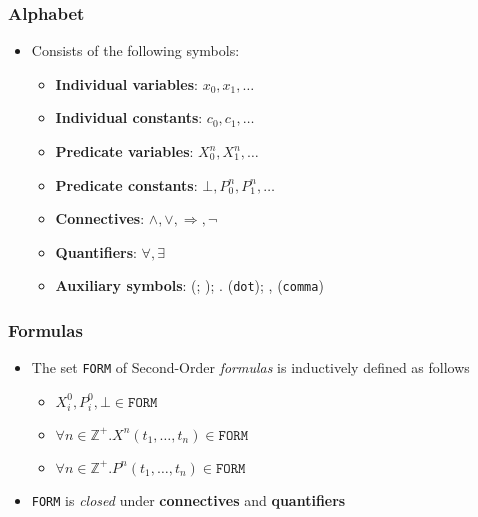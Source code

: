 \documentclass{beamer}
\begin{document}
                \begin{frame}
                    \frametitle{Alphabet}
                    \begin{itemize}
                        \item Consists of the following symbols:
                              \begin{itemize}
                                \item \textbf{Individual variables}: $ x_0, x_1, \dots $
                                \item \textbf{Individual constants}: $ c_0, c_1, \dots $
                                \item \textbf{Predicate variables}: $ X_0^n, X_1^n, \dots $
                                \item \textbf{Predicate constants}: $ \bot, P_0^n, P_1^n, \dots $
                                \item \textbf{Connectives}: $ \wedge, \vee, \Rightarrow, \neg $
                                \item \textbf{Quantifiers}: $ \forall, \exists $
                                \item \textbf{Auxiliary symbols}: (; ); . (\texttt{dot}); , (\texttt{comma})
                              \end{itemize}
                    \end{itemize}
                \end{frame}

                \begin{frame}
                    \frametitle{Formulas}
                    \begin{itemize}
                        \item The set \texttt{FORM} of Second-Order \textit{formulas} is inductively defined as follows
                              \begin{itemize}
                                \item $ X^0_i, P^0_i, \bot \in \texttt{FORM} $
                                \item $ \forall n \in \mathbb{Z}^+. X^n(t_1, \dots, t_n) \in \texttt{FORM} $
                                \item $ \forall n \in \mathbb{Z}^+. P^n(t_1, \dots, t_n) \in \texttt{FORM} $
                              \end{itemize}
                        \item \texttt{FORM} is \textit{closed} under \textbf{connectives} and \textbf{quantifiers}
                    \end{itemize}
                \end{frame}
\end{document}
